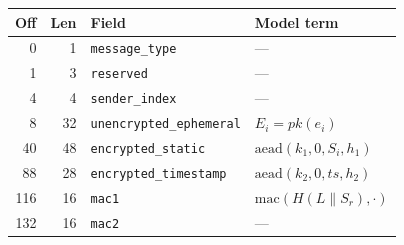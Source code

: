\begin{tabular}{@{}rrll@{}}
\toprule
Off & Len & Field & Model term \\
\midrule
0 & 1 & \texttt{message\_type} & \textcolor{black!45}{---} \\
1 & 3 & \texttt{reserved} & \textcolor{black!45}{---} \\
4 & 4 & \texttt{sender\_index} & \textcolor{black!45}{---} \\
8 & 32 & \texttt{unencrypted\_ephemeral} & $E_i=\mathit{pk}(e_i)$ \\
40 & 48 & \texttt{encrypted\_static} & $\mathrm{aead}(k_1,0,S_i,h_1)$ \\
88 & 28 & \texttt{encrypted\_timestamp} & $\mathrm{aead}(k_2,0,\mathit{ts},h_2)$ \\
116 & 16 & \texttt{mac1} & $\mathrm{mac}(H(L\|S_r),\cdot)$ \\
132 & 16 & \texttt{mac2} & \textcolor{black!45}{---} \\
\bottomrule
\end{tabular}
